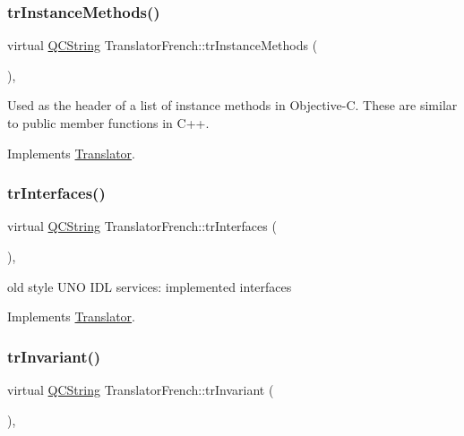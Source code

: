 \subsubsection{\texorpdfstring{trInstanceMethods()}{trInstanceMethods()}}
{\footnotesize\ttfamily virtual \mbox{\hyperlink{class_q_c_string}{Q\+C\+String}} Translator\+French\+::tr\+Instance\+Methods (\begin{DoxyParamCaption}{ }\end{DoxyParamCaption})\hspace{0.3cm}{\ttfamily [inline]}, {\ttfamily [virtual]}}

Used as the header of a list of instance methods in Objective-\/C. These are similar to public member functions in C++. 

Implements \mbox{\hyperlink{class_translator}{Translator}}.

\mbox{\label{class_translator_french_a7d36340d5ecf1a9d1a2c509434e9ae5a}} 
\subsubsection{\texorpdfstring{trInterfaces()}{trInterfaces()}}
{\footnotesize\ttfamily virtual \mbox{\hyperlink{class_q_c_string}{Q\+C\+String}} Translator\+French\+::tr\+Interfaces (\begin{DoxyParamCaption}{ }\end{DoxyParamCaption})\hspace{0.3cm}{\ttfamily [inline]}, {\ttfamily [virtual]}}

old style U\+NO I\+DL services\+: implemented interfaces 

Implements \mbox{\hyperlink{class_translator}{Translator}}.

\mbox{\label{class_translator_french_a1d7e9af256a89255e769a015592808db}} 
\subsubsection{\texorpdfstring{trInvariant()}{trInvariant()}}
{\footnotesize\ttfamily virtual \mbox{\hyperlink{class_q_c_string}{Q\+C\+String}} Translator\+French\+::tr\+Invariant (\begin{DoxyParamCaption}{ }\end{DoxyParamCaption})\hspace{0.3cm}{\ttfamily [inline]}, {\ttfamily [virtual]}}

